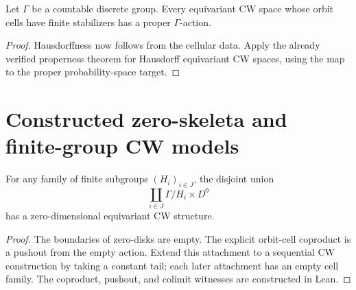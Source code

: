 \begin{proposition}\label{prop:equivariant-cw-proper}
\leanok
Let $\Gamma$ be a countable discrete group. Every equivariant CW space
whose orbit cells have finite stabilizers has a proper $\Gamma$-action.
\end{proposition}
\begin{proof}
\leanok
Hausdorffness now follows from the cellular data. Apply the already
verified properness theorem for Hausdorff equivariant CW spaces, using the
map to the proper probability-space target.
\end{proof}

\section{Constructed zero-skeleta and finite-group CW models}

\begin{proposition}\label{prop:orbit-zero-skeleton-cw}
For any family of finite subgroups $(H_i)_{i\in J}$, the disjoint union
\[
  \coprod_{i\in J} \Gamma/H_i\times D^0
\]
has a zero-dimensional equivariant CW structure.
\end{proposition}
\begin{proof}
\leanok
The boundaries of zero-disks are empty. The explicit orbit-cell coproduct
is a pushout from the empty action. Extend this attachment to a sequential
CW construction by taking a constant tail; each later attachment has an
empty cell family. The coproduct, pushout, and colimit witnesses are
constructed in Lean.
\end{proof}

